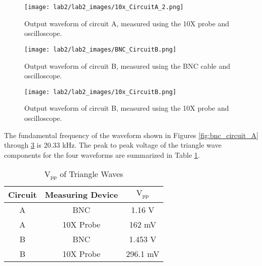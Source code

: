 \documentclass[12pt,letterpaper]{report}
\newlength \figwidth
\begin{document}
\begin{figure}
\centering
\texttt{[image: lab2/lab2\_images/10x\_CircuitA\_2.png]}
\caption{Output waveform of circuit A, measured using the 10X probe and oscilloscope.}
\label{fig:10x_circuit_A}
\end{figure}

\begin{figure}
\centering
\texttt{[image: lab2/lab2\_images/BNC\_CircuitB.png]}
\caption{Output waveform of circuit B, measured using the BNC cable and oscilloscope.}
\label{fig:bnc_circuit_B}
\end{figure}

\begin{figure}
\centering
\texttt{[image: lab2/lab2\_images/10x\_CircuitB.png]}
\caption{Output waveform of circuit B, measured using the 10X probe and oscilloscope.}
\label{fig:10x_circuit_B}
\end{figure}

The fundamental frequency of the waveform shown in Figures \ref{fig:bnc_circuit_A} through \ref{fig:10x_circuit_B} is 20.33 kHz. The peak to peak voltage of the triangle wave components for the four waveforms are summarized in Table \ref{table:vpp}.

\begin{table}[ht]
\caption{$\text{V}_{\text{pp}}$ of Triangle Waves} %
\centering 
    \begin{tabular}{| c | c | c |}
    \hline  
    Circuit & Measuring Device & $\text{V}_{\text{pp}}$ \\
    \hline
    A & BNC & 1.16 V \\
    A & 10X Probe & 162 mV \\
    B & BNC & 1.453 V \\
    B & 10X Probe & 296.1 mV \\
    \hline
    \end{tabular}
    \label{table:vpp}
\end{table}
\end{document}
